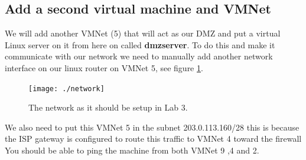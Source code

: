 \documentclass[paper=a4, fontsize=11pt]{report} %
\begin{document}
\subsection{Add a second virtual machine and VMNet}
We will add another VMNet (5) that will act as our DMZ and put a virtual Linux server on it from here on called \textbf{dmzserver}.  To do this and make it communicate with our network we need to manually add another network interface on our linux router on VMNet 5, see figure \figurename \ref{fig:network}.
\begin{figure}[h]
\centering
\texttt{[image: ./network]}
\caption[Figure over network in Lab 3]{The network as it should be setup in Lab 3.}
\label{fig:network}
\end{figure}
We also need to put this VMNet 5 in the subnet 203.0.113.160/28 this is because the ISP gateway is configured to route this traffic to VMNet 4 toward the firewall You should be able to ping the machine from both VMNet 9 ,4 and 2.
\end{document}

